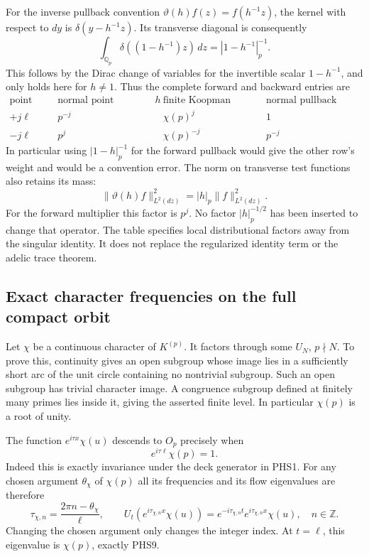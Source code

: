 For the inverse pullback convention $\vartheta(h)f(z)=f(h^{-1}z)$,
the kernel with respect to $dy$ is $\delta(y-h^{-1}z)$.
Its transverse diagonal is consequently
\begin{equation}\tag{PHS20}
 \int_{\mathbb Q_p}\delta((1-h^{-1})z)\,dz
       =|1-h^{-1}|_p^{-1}.
\end{equation}
This follows by the Dirac change of variables for the invertible
scalar $1-h^{-1}$, and only holds here for $h\ne1$.
Thus the complete forward and backward entries are
\begin{equation}\tag{PHS21}
 \begin{array}{c|c|c|c}
 \text{point time}&\text{normal point multiplier }h&
 \text{finite Koopman character}&
 \text{normal pullback diagonal}\\ \hline
 +j\ell&p^{-j}&\chi(p)^j&1\\
 -j\ell&p^j&\chi(p)^{-j}&p^{-j}
 \end{array}
\end{equation}
In particular using $|1-h|_p^{-1}$ for the forward pullback would
give the other row's weight and would be a convention error.
The norm on transverse test functions also retains its mass:
\[
 \|\vartheta(h)f\|_{L^2(dz)}^2=|h|_p\|f\|_{L^2(dz)}^2.
\]
For the forward multiplier this factor is $p^j$. No factor
$|h|_p^{-1/2}$ has been inserted to change that operator.
The table specifies local distributional factors away from the
singular identity. It does not replace the regularized identity
term or the adelic trace theorem.

\subsection{Exact character frequencies on the full compact orbit}

Let $\chi$ be a continuous character of $K^{(p)}$. It factors
through some $U_N$, $p\nmid N$. To prove this, continuity gives
an open subgroup whose image lies in a sufficiently short arc of
the unit circle containing no nontrivial subgroup. Such an open
subgroup has trivial character image. A congruence subgroup
defined at finitely many primes lies inside it, giving the asserted
finite level. In particular $\chi(p)$ is a root of unity.

The function $e^{i\tau x}\chi(u)$ descends to $O_p$ precisely when
\begin{equation}\tag{PHS22}
 e^{i\tau\ell}\chi(p)=1.
\end{equation}
Indeed this is exactly invariance under the deck generator in PHS1.
For any chosen argument $\theta_\chi$ of $\chi(p)$ all its
frequencies and its flow eigenvalues are therefore
\begin{equation}\tag{PHS23}
 \tau_{\chi,n}=\frac{2\pi n-\theta_\chi}{\ell},\qquad
 U_t(e^{i\tau_{\chi,n}x}\chi(u))
       =e^{-i\tau_{\chi,n}t}e^{i\tau_{\chi,n}x}\chi(u),
 \quad n\in\mathbb Z.
\end{equation}
Changing the chosen argument only changes the integer index. At
$t=\ell$, this eigenvalue is $\chi(p)$, exactly PHS9.

